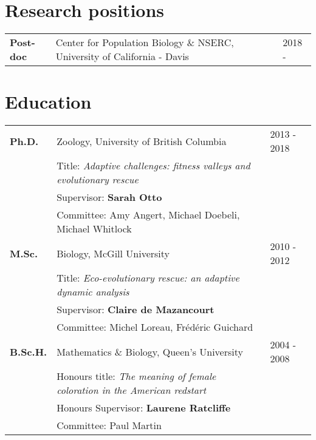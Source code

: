 \documentclass[12pt]{article}
\begin{document}

\section*{Research positions}

\begin{tabular}{lll}
\textbf{Post-doc} & Center for Population Biology \& NSERC, University of California - Davis & 2018 -
\end{tabular}

\section*{Education}

\begin{tabular}{lll}
\textbf{Ph.D.} & Zoology, University of British Columbia & 2013 - 2018\\
& Title: \textit{Adaptive challenges: fitness valleys and evolutionary rescue}\\
& Supervisor: \textbf{Sarah Otto}\\
& Committee: Amy Angert, Michael Doebeli, Michael Whitlock\\
\textbf{M.Sc.} & Biology, McGill University & 2010 - 2012 \\
& Title: \textit{Eco-evolutionary rescue: an adaptive dynamic analysis}  \\
& Supervisor: \textbf{Claire de Mazancourt}\\
& Committee: Michel Loreau, Fr\'{e}d\'{e}ric Guichard\\
\textbf{B.Sc.H.} &  Mathematics \& Biology, Queen's University & 2004 - 2008\\ %
& Honours title: \textit{The meaning of female coloration in the American redstart}  \\
& Honours Supervisor: \textbf{Laurene Ratcliffe}\\
& Committee: Paul Martin\\
\end{tabular}
\end{document}

